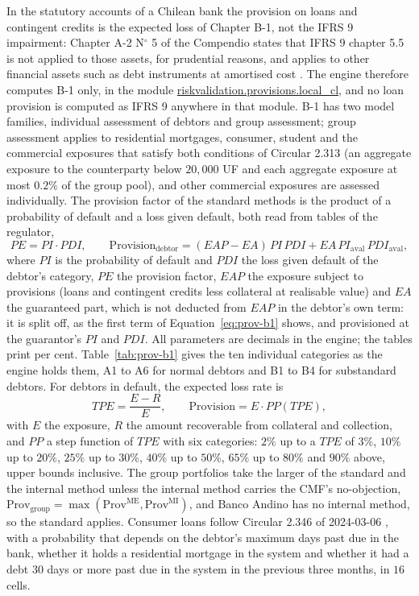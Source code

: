 In the statutory accounts of a Chilean bank the provision on loans and contingent credits is the expected loss of Chapter B-1, not the IFRS 9 impairment: Chapter A-2 N$^{\circ}$ 5 of the Compendio states that IFRS 9 chapter 5.5 is not applied to
those assets, for prudential reasons, and applies to other financial assets such as debt instruments at amortised cost \citep{provisions:cmfcncb}. The engine therefore computes B-1 only, in the module \url{riskvalidation.provisions.local_cl}, and no loan provision
is computed as IFRS 9 anywhere in that module. B-1 has two model families, individual assessment of debtors and group assessment; group assessment applies to residential mortgages, consumer, student and the commercial exposures that satisfy both conditions of Circular 2.313 (an aggregate
exposure to the counterparty below $20{,}000$ UF and each aggregate exposure at most $0.2\%$ of the group pool), and other commercial exposures are assessed individually. The provision factor of the standard methods is the product of a probability of default
and a loss given default, both read from tables of the regulator,
\begin{equation}
PE=PI\cdot PDI,\qquad \mathrm{Provision}_{\mathrm{debtor}}=(EAP-EA)\,PI\,PDI+EA\,PI_{\mathrm{aval}}\,PDI_{\mathrm{aval}},
\label{eq:prov-b1}
\end{equation}
where $PI$ is the probability of default and $PDI$ the loss given default of the debtor's category, $PE$ the provision factor, $EAP$ the exposure subject to provisions (loans and contingent credits less collateral at realisable value) and $EA$ the guaranteed part, which is not deducted from $EAP$ in the debtor's own term: it is split off, as the first term of Equation~\ref{eq:prov-b1} shows, and provisioned at the guarantor's $PI$ and $PDI$. All parameters are decimals in the engine; the tables print per cent. Table~\ref{tab:prov-b1} gives the ten individual categories as the engine holds them, A1 to A6 for normal debtors and B1 to B4 for substandard debtors. For debtors in default, the expected loss rate is
\begin{equation}
TPE=\frac{E-R}{E},\qquad \mathrm{Provision}=E\cdot PP(TPE),
\label{eq:prov-b1-default}
\end{equation}
with $E$ the exposure, $R$ the amount recoverable from collateral and collection, and $PP$ a step function of $TPE$ with six categories: $2\%$ up to a $TPE$ of $3\%$, $10\%$ up to $20\%$, $25\%$ up to $30\%$, $40\%$ up to $50\%$, $65\%$ up to $80\%$ and $90\%$ above, upper bounds inclusive. The group portfolios take the larger of the standard and the internal method unless the internal method carries the CMF's
no-objection, $\mathrm{Prov}_{\mathrm{group}}=\max(\mathrm{Prov}^{\mathrm{ME}},\mathrm{Prov}^{\mathrm{MI}})$, and Banco Andino has no internal method, so the standard applies. Consumer loans follow Circular 2.346 of 2024-03-06 \citep{provisions:cmf2346}, with a probability that depends on the debtor's maximum days past due in the bank,
whether it holds a residential mortgage in the system and whether it had a debt $30$ days or more past due in the system in the previous three months, in $16$ cells.

